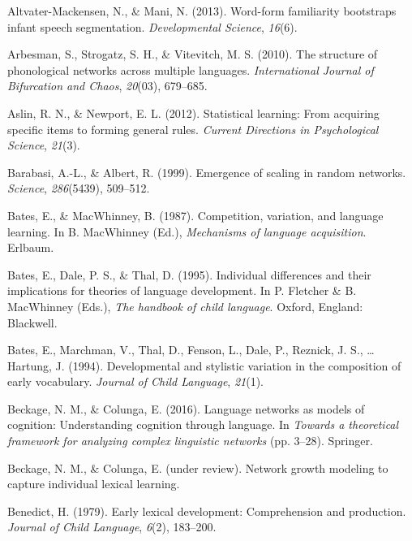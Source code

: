 \documentclass[english,floatsintext,man]{apa6}
\theoremstyle{definition}
\theoremstyle{definition}
\theoremstyle{definition}
\theoremstyle{remark}
\begin{document}
\setlength{\parindent}{-0.5in} \setlength{\leftskip}{0.5in}

\hypertarget{refs}{}
\hypertarget{ref-altvater2013}{}
Altvater-Mackensen, N., \& Mani, N. (2013). Word-form familiarity
bootstraps infant speech segmentation. \emph{Developmental Science},
\emph{16}(6).

\hypertarget{ref-arbesman2010}{}
Arbesman, S., Strogatz, S. H., \& Vitevitch, M. S. (2010). The structure
of phonological networks across multiple languages. \emph{International
Journal of Bifurcation and Chaos}, \emph{20}(03), 679--685.

\hypertarget{ref-aslin2012}{}
Aslin, R. N., \& Newport, E. L. (2012). Statistical learning: From
acquiring specific items to forming general rules. \emph{Current
Directions in Psychological Science}, \emph{21}(3).

\hypertarget{ref-barabasi99}{}
Barabasi, A.-L., \& Albert, R. (1999). Emergence of scaling in random
networks. \emph{Science}, \emph{286}(5439), 509--512.

\hypertarget{ref-bates1987}{}
Bates, E., \& MacWhinney, B. (1987). Competition, variation, and
language learning. In B. MacWhinney (Ed.), \emph{Mechanisms of language
acquisition}. Erlbaum.

\hypertarget{ref-bates1995}{}
Bates, E., Dale, P. S., \& Thal, D. (1995). Individual differences and
their implications for theories of language development. In P. Fletcher
\& B. MacWhinney (Eds.), \emph{The handbook of child language}. Oxford,
England: Blackwell.

\hypertarget{ref-bates1994}{}
Bates, E., Marchman, V., Thal, D., Fenson, L., Dale, P., Reznick, J. S.,
\ldots{} Hartung, J. (1994). Developmental and stylistic variation in
the composition of early vocabulary. \emph{Journal of Child Language},
\emph{21}(1).

\hypertarget{ref-beckage2016}{}
Beckage, N. M., \& Colunga, E. (2016). Language networks as models of
cognition: Understanding cognition through language. In \emph{Towards a
theoretical framework for analyzing complex linguistic networks} (pp.
3--28). Springer.

\hypertarget{ref-beckage}{}
Beckage, N. M., \& Colunga, E. (under review). Network growth modeling
to capture individual lexical learning.

\hypertarget{ref-benedict1979}{}
Benedict, H. (1979). Early lexical development: Comprehension and
production. \emph{Journal of Child Language}, \emph{6}(2), 183--200.
\end{document}
